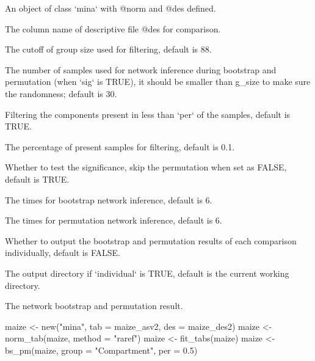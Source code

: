 \documentclass[a4paper]{book}
\begin{document}
\begin{Arguments}
\begin{ldescription}
\item[\code{x}] An object of class `mina` with @norm and @des defined.

\item[\code{group}] The column name of descriptive file @des for comparison.

\item[\code{g\_size}] The cutoff of group size used for filtering, default is 88.

\item[\code{s\_size}] The number of samples used for network inference during
bootstrap and permutation (when `sig` is TRUE), it should be smaller than
g\_size to make sure the randomness; default is 30.

\item[\code{rm}] Filtering the components present in less than `per` of the samples,
default is TRUE.

\item[\code{per}] The percentage of present samples for filtering, default is 0.1.

\item[\code{sig}] Whether to test the significance, skip the permutation when set as
FALSE, default is TRUE.

\item[\code{bs}] The times for bootstrap network inference, default is 6.

\item[\code{pm}] The times for permutation network inference, default is 6.

\item[\code{individual}] Whether to output the bootstrap and permutation results of
each comparison individually, default is FALSE.

\item[\code{out\_dir}] The output directory if `individual` is TRUE, default is the
current working directory.
\end{ldescription}
\end{Arguments}
%
\begin{Value}
The network bootstrap and permutation result.
\end{Value}
%
\begin{Examples}
\begin{ExampleCode}
maize <- new("mina", tab = maize_asv2, des = maize_des2)
maize <- norm_tab(maize, method = "raref")
maize <- fit_tabs(maize)
maize <- bs_pm(maize, group = "Compartment", per = 0.5)
\end{ExampleCode}
\end{Examples}
\end{document}

